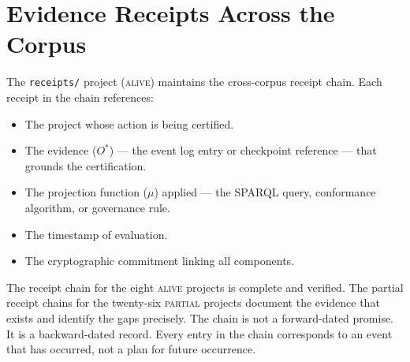 \section{Evidence Receipts Across the Corpus}

The \texttt{receipts/} project (\textsc{alive}) maintains the cross-corpus receipt chain. Each receipt in the chain references:

\begin{itemize}
  \item The project whose action is being certified.
  \item The evidence ($O^{*}$) --- the event log entry or checkpoint reference --- that grounds the certification.
  \item The projection function ($\mu$) applied --- the SPARQL query, conformance algorithm, or governance rule.
  \item The timestamp of evaluation.
  \item The cryptographic commitment linking all components.
\end{itemize}

The receipt chain for the eight \textsc{alive} projects is complete and verified. The partial receipt chains for the twenty-six \textsc{partial} projects document the evidence that exists and identify the gaps precisely. The chain is not a forward-dated promise. It is a backward-dated record. Every entry in the chain corresponds to an event that has occurred, not a plan for future occurrence.
